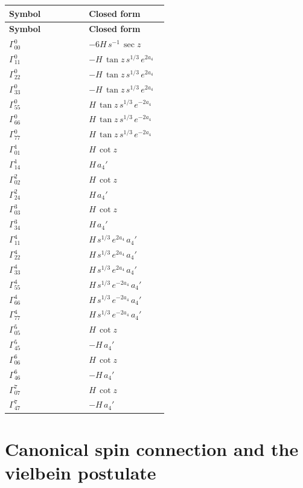 \documentclass[11pt]{article}
\begin{document}
\begin{longtable}{@{}p{0.460\linewidth}p{0.460\linewidth}@{}}
\toprule
\textbf{Symbol} & \textbf{Closed form} \\
\midrule
\endfirsthead
\toprule
\textbf{Symbol} & \textbf{Closed form} \\
\midrule
\endhead
$\Gamma^{0}_{00}$ & $-6H\,s^{-1}\,\sec z$ \\
$\Gamma^{0}_{11}$ & $-H\,\tan z\,s^{1/3}\,e^{2a_4}$ \\
$\Gamma^{0}_{22}$ & $-H\,\tan z\,s^{1/3}\,e^{2a_4}$ \\
$\Gamma^{0}_{33}$ & $-H\,\tan z\,s^{1/3}\,e^{2a_4}$ \\
$\Gamma^{0}_{55}$ & $H\,\tan z\,s^{1/3}\,e^{-2a_4}$ \\
$\Gamma^{0}_{66}$ & $H\,\tan z\,s^{1/3}\,e^{-2a_4}$ \\
$\Gamma^{0}_{77}$ & $H\,\tan z\,s^{1/3}\,e^{-2a_4}$ \\
$\Gamma^{1}_{01}$ & $H\,\cot z$ \\
$\Gamma^{1}_{14}$ & $H\,a_4'$ \\
$\Gamma^{2}_{02}$ & $H\,\cot z$ \\
$\Gamma^{2}_{24}$ & $H\,a_4'$ \\
$\Gamma^{3}_{03}$ & $H\,\cot z$ \\
$\Gamma^{3}_{34}$ & $H\,a_4'$ \\
$\Gamma^{4}_{11}$ & $H\,s^{1/3}\,e^{2a_4}\,a_4'$ \\
$\Gamma^{4}_{22}$ & $H\,s^{1/3}\,e^{2a_4}\,a_4'$ \\
$\Gamma^{4}_{33}$ & $H\,s^{1/3}\,e^{2a_4}\,a_4'$ \\
$\Gamma^{4}_{55}$ & $H\,s^{1/3}\,e^{-2a_4}\,a_4'$ \\
$\Gamma^{4}_{66}$ & $H\,s^{1/3}\,e^{-2a_4}\,a_4'$ \\
$\Gamma^{4}_{77}$ & $H\,s^{1/3}\,e^{-2a_4}\,a_4'$ \\
$\Gamma^{5}_{05}$ & $H\,\cot z$ \\
$\Gamma^{5}_{45}$ & $-H\,a_4'$ \\
$\Gamma^{6}_{06}$ & $H\,\cot z$ \\
$\Gamma^{6}_{46}$ & $-H\,a_4'$ \\
$\Gamma^{7}_{07}$ & $H\,\cot z$ \\
$\Gamma^{7}_{47}$ & $-H\,a_4'$ \\
\bottomrule
\end{longtable}

\section{Canonical spin connection and the vielbein postulate}
\end{document}

